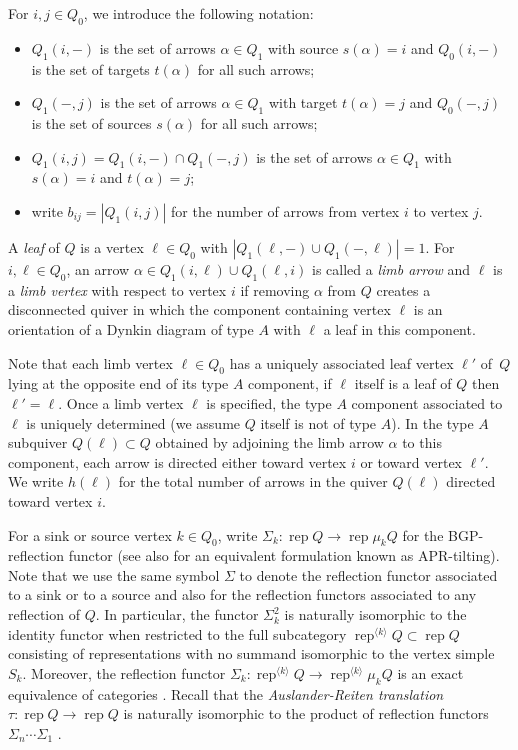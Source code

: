 \documentclass{amsart}
\numberwithin{equation}{section}
\newcommand{\rep}{\operatorname{rep}}
\begin{document}
For $i,j\in Q_0$, we introduce the following notation:
\begin{itemize}
  \item $Q_1(i,-)$ is the set of arrows $\alpha\in Q_1$ with source $s(\alpha)=i$ and $Q_0(i,-)$ is the set of targets $t(\alpha)$ for all such arrows;
  \item $Q_1(-,j)$ is the set of arrows $\alpha\in Q_1$ with target $t(\alpha)=j$ and $Q_0(-,j)$ is the set of sources $s(\alpha)$ for all such arrows;
  \item $Q_1(i,j)=Q_1(i,-)\cap Q_1(-,j)$ is the set of arrows $\alpha\in Q_1$ with $s(\alpha)=i$ and $t(\alpha)=j$;
  \item write $b_{ij}=|Q_1(i,j)|$ for the number of arrows from vertex $i$ to vertex $j$.
\end{itemize}

A \emph{leaf} of $Q$ is a vertex $\ell\in Q_0$ with $|Q_1(\ell,-)\cup Q_1(-,\ell)|=1$.
For $i,\ell\in Q_0$, an arrow $\alpha\in Q_1(i,\ell)\cup Q_1(\ell,i)$ is called a \emph{limb arrow} and $\ell$ is a \emph{limb vertex} with respect to vertex $i$ if removing $\alpha$ from $Q$ creates a disconnected quiver in which the component containing vertex $\ell$ is an orientation of a Dynkin diagram of type $A$ with $\ell$ a leaf in this component.

Note that each limb vertex $\ell\in Q_0$ has a uniquely associated leaf vertex $\ell'$ of~$Q$ lying at the opposite end of its type $A$ component, if $\ell$ itself is a leaf of $Q$ then $\ell'=\ell$.
Once a limb vertex $\ell$ is specified, the type $A$ component associated to $\ell$ is uniquely determined (we assume $Q$ itself is not of type $A$).
In the type $A$ subquiver $Q(\ell)\subset Q$ obtained by adjoining the limb arrow $\alpha$ to this component, each arrow is directed either toward vertex $i$ or toward vertex $\ell'$.
We write $h(\ell)$ for the total number of arrows in the quiver $Q(\ell)$ directed toward vertex $i$.

For a sink or source vertex $k\in Q_0$, write $\Sigma_k:\rep Q\to\rep \mu_k Q$ for the BGP-reflection functor \cite{BGP??} (see also \cite{APR??} for an equivalent formulation known as APR-tilting).
Note that we use the same symbol $\Sigma$ to denote the reflection functor associated to a sink or to a source and also for the reflection functors associated to any reflection of $Q$.
In particular, the functor $\Sigma_k^2$ is naturally isomorphic to the identity functor when restricted to the full subcategory $\rep^{\langle k\rangle} Q\subset\rep Q$ consisting of representations with no summand isomorphic to the vertex simple $S_k$.
Moreover, the reflection functor $\Sigma_k:\rep^{\langle k\rangle} Q\to\rep^{\langle k\rangle} \mu_k Q$ is an exact equivalence of categories \cite{DR76}.
Recall that the \emph{Auslander-Reiten translation} $\tau:\rep Q\to\rep Q$ is naturally isomorphic to the product of reflection functors $\Sigma_n\cdots\Sigma_1$ \cite{BB??}.
\end{document}
